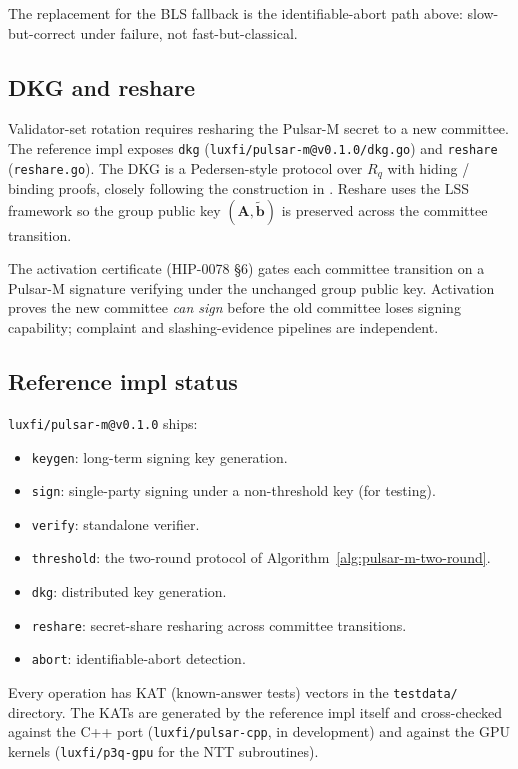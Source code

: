 The replacement for the BLS fallback is the identifiable-abort path above:
slow-but-correct under failure, not fast-but-classical.

\subsection{DKG and reshare}

Validator-set rotation requires resharing the Pulsar-M secret to a new
committee. The reference impl exposes \texttt{dkg}
(\texttt{luxfi/pulsar-m@v0.1.0/dkg.go}) and \texttt{reshare}
(\texttt{reshare.go}). The DKG is a Pedersen-style protocol over $R_q$ with
hiding / binding proofs, closely following the construction in
\cite{krt24,gks24}. Reshare uses the LSS framework \cite{luxlssmpc} so the
group public key $(\mathbf{A}, \tilde{\mathbf{b}})$ is preserved across
the committee transition.

The activation certificate (HIP-0078 §6) gates each committee transition on
a Pulsar-M signature verifying under the unchanged group public key.
Activation proves the new committee \emph{can sign} before the old committee
loses signing capability; complaint and slashing-evidence pipelines are
independent.

\subsection{Reference impl status}

\texttt{luxfi/pulsar-m@v0.1.0} ships:

\begin{itemize}[leftmargin=2em,nosep]
  \item \texttt{keygen}: long-term signing key generation.
  \item \texttt{sign}: single-party signing under a non-threshold key
    (for testing).
  \item \texttt{verify}: standalone verifier.
  \item \texttt{threshold}: the two-round protocol of
    Algorithm~\ref{alg:pulsar-m-two-round}.
  \item \texttt{dkg}: distributed key generation.
  \item \texttt{reshare}: secret-share resharing across committee
    transitions.
  \item \texttt{abort}: identifiable-abort detection.
\end{itemize}

Every operation has KAT (known-answer tests) vectors in the
\texttt{testdata/} directory. The KATs are generated by the reference impl
itself and cross-checked against the C++ port (\texttt{luxfi/pulsar-cpp},
in development) and against the GPU kernels (\texttt{luxfi/p3q-gpu} for the
NTT subroutines).
